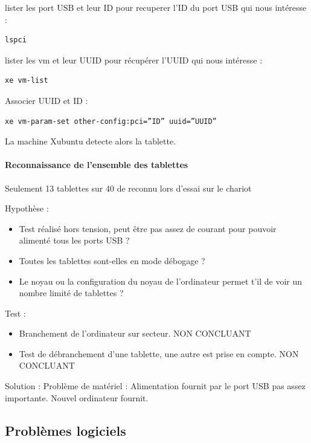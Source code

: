 \documentclass[a4paper,12pt]{extarticle}
\begin{document}
lister les port USB et leur ID pour recuperer l'ID du port USB qui nous intéresse :
\begin{verbatim}
lspci
\end{verbatim}

lister les vm et leur UUID pour récupérer l’UUID qui nous intéresse :
\begin{verbatim}
xe vm-list
\end{verbatim}

Associer UUID et ID :
\begin{verbatim}
xe vm-param-set other-config:pci=”ID” uuid=”UUID”
\end{verbatim}
La machine Xubuntu detecte alors la tablette.



\paragraph{Reconnaissance de l'ensemble des tablettes\\}
Seulement 13 tablettes sur 40 de reconnu lors d'essai sur le chariot

Hypothèse :
\begin{itemize}
\item Test réalisé hors tension, peut être pas assez de courant pour pouvoir alimenté tous les ports USB ? 
\item Toutes les tablettes sont-elles en mode débogage ? 
\item Le noyau ou la configuration du noyau de l'ordinateur permet t'il de voir un nombre limité de tablettes ? \\
\end{itemize}

Test :
\begin{itemize}
\item Branchement de l'ordinateur sur secteur. NON CONCLUANT
\item Test de débranchement d'une tablette, une autre est prise en compte. NON CONCLUANT \\
\end{itemize}

Solution :
Problème de matériel : Alimentation fournit par le port USB pas assez importante. 
Nouvel ordinateur fournit.



\subsection{Problèmes logiciels}
\end{document}
